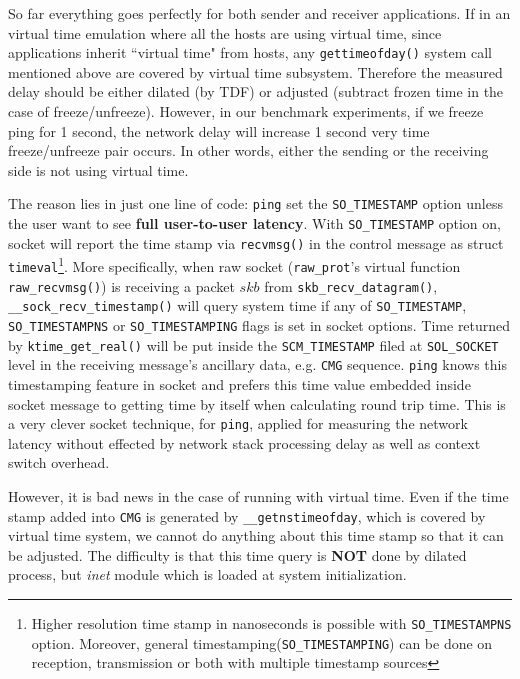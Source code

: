 \documentclass{acm_proc_article-sp}
\begin{document}
So far everything goes perfectly for both sender and receiver applications. 
If in an virtual time emulation where all the hosts are using virtual time, since applications inherit ``virtual time" from hosts, any \texttt{gettimeofday()} system call mentioned above are covered by virtual time subsystem. 
Therefore the measured delay should be either dilated (by TDF) or adjusted (subtract frozen time in the case of freeze/unfreeze).
However, in our benchmark experiments, if we freeze ping for 1 second, the network delay will increase 1 second very time freeze/unfreeze pair occurs. In other words, either the sending or the receiving side is not using virtual time. 

The reason lies in just one line of code: \texttt{ping} set the \texttt{SO\_TIMESTAMP} option unless the user want to see \textbf{full user-to-user latency}. 
With \texttt{SO\_TIMESTAMP} option on, socket will report the time stamp via \texttt{recvmsg()} in the control message as struct \texttt{timeval}\footnote{Higher resolution time stamp in nanoseconds is possible with \texttt{SO\_TIMESTAMPNS} option. Moreover, general timestamping(\texttt{SO\_TIMESTAMPING}) can be done on reception, transmission or both with multiple timestamp sources}.
More specifically, when raw socket (\texttt{raw\_prot}'s virtual function \texttt{raw\_recvmsg()}) is receiving a packet $skb$ from \texttt{skb\_recv\_datagram()}, 
\texttt{\_\_sock\_recv\_timestamp()} will query system time if any of \texttt{SO\_TIMESTAMP}, \texttt{SO\_TIMESTAMPNS} or \texttt{SO\_TIMESTAMPING} flags is set in socket options. 
Time returned by \texttt{ktime\_get\_real()} will be put inside the \texttt{SCM\_TIMESTAMP} filed at \texttt{SOL\_SOCKET} level in the receiving message's ancillary data, e.g. \texttt{CMG} sequence.
\texttt{ping} knows this timestamping feature in socket and prefers this time value embedded inside socket message to getting time by itself when calculating round trip time.
This is a very clever socket technique, for \texttt{ping}, applied for measuring the network latency without effected by network stack processing delay as well as context switch overhead.

However, it is bad news in the case of running with virtual time. Even if the time stamp added into \texttt{CMG} is generated by \texttt{\_\_getnstimeofday}, which is covered by virtual time system, we cannot do anything about this time stamp so that it can be adjusted. 
The difficulty is that this time query is \textbf{NOT} done by dilated process, but \textit{inet} module which is loaded at system initialization.
\end{document}
